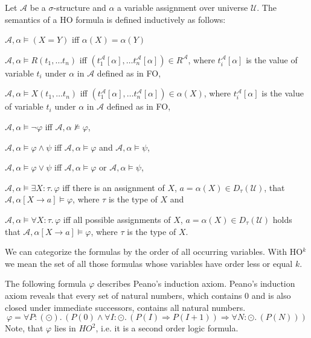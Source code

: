 \begin{definition}
    Let $\mathcal{A}$ be a $\sigma$-structure and $\alpha$ a variable assignment over universe $\mathcal{U}$. The
    semantics of a HO formula is defined inductively as follows:
    \begin{compactitem}
        \item $\mathcal{A}, \alpha \models (X = Y)$ iff $\alpha(X) = \alpha(Y)$
        \item $\mathcal{A}, \alpha \models R(t_1, \dots t_n)$ iff $(t_1^{\mathcal{A}}[\alpha], \dots
        t_n^{\mathcal{A}}[\alpha]) \in R^{\mathcal{A}}$, where $t_i^{\mathcal{A}}[\alpha]$ is the value of variable
        $t_i$ under $\alpha$ in $\mathcal{A}$ defined as in FO,
        \item $\mathcal{A}, \alpha \models X(t_1, \dots t_n)$ iff $(t_1^{\mathcal{A}}[\alpha], \dots
        t_n^{\mathcal{A}}[\alpha]) \in \alpha(X)$, where $t_i^{\mathcal{A}}[\alpha]$ is the value of variable
        $t_i$ under $\alpha$ in $\mathcal{A}$ defined as in FO,
        \item $\mathcal{A}, \alpha \models \neg\varphi$ iff $\mathcal{A}, \alpha\not\models\varphi$,
        \item $\mathcal{A}, \alpha \models \varphi \wedge \psi$ iff $\mathcal{A}, \alpha\models\varphi$ and $\mathcal{A},
        \alpha\models\psi$,
        \item $\mathcal{A}, \alpha \models \varphi \vee \psi$ iff $\mathcal{A}, \alpha\models\varphi$ or $\mathcal{A},
        \alpha\models\psi$,
        \item $\mathcal{A}, \alpha \models \exists X\colon\tau.\,\varphi$ iff there is an assignment of $X$, $a =
        \alpha
        (X) \in D_{\tau}
        (\mathcal{U})$, that $\mathcal{A}, \alpha[X \rightarrow a] \models \varphi$, where $\tau$ is the type of $X$ and
        \item $\mathcal{A}, \alpha \models \forall X\colon\tau.\,\varphi$ iff all possible assignments of $X$, $a =
        \alpha(X) \in
        D_{\tau}(\mathcal{U})$ holds that $\mathcal{A}, \alpha[X \rightarrow a] \models \varphi$, where $\tau$ is the
        type of
        $X$.
        \end{compactitem}
\end{definition}

We can categorize the formulas by the order of all occurring variables. With HO$^k$ we mean the set of all those
formulas whose variables have order less or equal $k$.

\begin{example}{\cite{vanBenthem2001higher}}
    \label{example:ho}
    The following formula $\varphi$ describes Peano's induction axiom. Peano's induction axiom reveals that every set
    of natural numbers, which contains $0$ and is also closed under immediate successors, contains all natural numbers.
    \[\varphi = \forall P\colon(\odot).\,(P(0) \wedge \forall I\colon\odot.\,(P(I) \Rightarrow P(I + 1)) \Rightarrow
    \forall N \colon\odot.\,(P(N)))\]
    Note, that $\varphi$ lies in $\mathit{HO}^2$, i.e. it is a second order logic formula.
\end{example}

